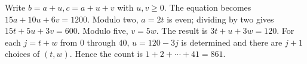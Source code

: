 Write $b=a+u,c=a+u+v$ with $u,v\ge0$. The equation becomes $15a+10u+6v=1200$. Modulo two, $a=2t$ is even; dividing by two gives $15t+5u+3v=600$. Modulo five, $v=5w$. The result is $3t+u+3w=120$. For each $j=t+w$ from $0$ through $40$, $u=120-3j$ is determined and there are $j+1$ choices of $(t,w)$. Hence the count is $1+2+\cdots+41=\boxed{861}$.
